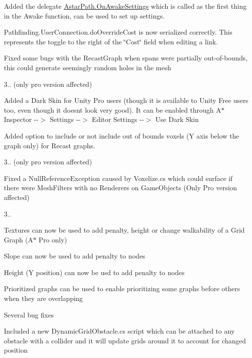 \begin{DoxyItemize}
\begin{DoxyItemize}
\item Added the delegate \mbox{\hyperlink{class_astar_path_a62ccea188e2d83885f22f4745535a16b}{Astar\+Path.\+On\+Awake\+Settings}} which is called as the first thing in the Awake function, can be used to set up settings.
\item Pathfinding.\+User\+Connection.\+do\+Override\+Cost is now serialized correctly. This represents the toggle to the right of the \char`\"{}\+Cost\char`\"{} field when editing a link.
\item Fixed some bugs with the Recast\+Graph when spans were partially out-\/of-\/bounds, this could generate seemingly random holes in the mesh
\end{DoxyItemize}
\item 3.. (only pro version affected)
\begin{DoxyItemize}
\item Added a Dark Skin for Unity Pro users (though it is available to Unity Free users too, even though it doesn\textquotesingle{}t look very good). It can be enabled through A$\ast$ Inspector -\/-\/$>$ Settings -\/-\/$>$ Editor Settings -\/-\/$>$ Use Dark Skin
\item Added option to include or not include out of bounds voxels (Y axis below the graph only) for Recast graphs.
\end{DoxyItemize}
\item 3.. (only pro version affected)
\begin{DoxyItemize}
\item Fixed a Null\+Reference\+Exception caused by Voxelize.\+cs which could surface if there were Mesh\+Filters with no Renderers on Game\+Objects (Only Pro version affected)
\end{DoxyItemize}
\item 3..
\begin{DoxyItemize}
\item Textures can now be used to add penalty, height or change walkability of a Grid Graph (A$\ast$ Pro only)
\item Slope can now be used to add penalty to nodes
\item Height (Y position) can now be usd to add penalty to nodes
\item Prioritized graphs can be used to enable prioritizing some graphs before others when they are overlapping
\item Several bug fixes
\item Included a new Dynamic\+Grid\+Obstacle.\+cs script which can be attached to any obstacle with a collider and it will update grids around it to account for changed position

\end{DoxyItemize}
\end{DoxyItemize}
